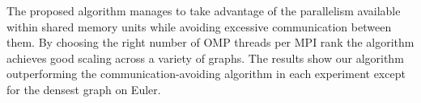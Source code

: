 The proposed algorithm manages to take advantage of the parallelism available within shared memory units while avoiding excessive communication between them. By choosing the right number of OMP threads per MPI rank the algorithm achieves good scaling across a variety of graphs. The results show our algorithm outperforming the communication-avoiding algorithm \cite{comm_avoiding} in each experiment except for the densest graph on Euler.